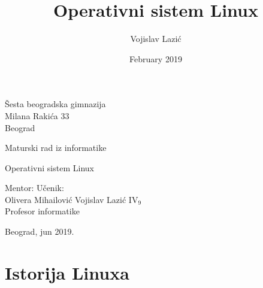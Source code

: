 \documentclass[12pt,twoside,a4paper]{article}
\title{Operativni sistem Linux}
\author{Vojislav Lazić}
\date{February 2019}
\begin{document}
    \thispagestyle{empty}
    \noindent
    Šesta beogradska gimnazija\\
    Milana Rakića 33\\
    Beograd
    \vfill
    \begin{center}
        \begin{Large}
        Maturski rad iz informatike\\
        \bigskip 
        \end{Large}
        {\Huge
        Operativni sistem Linux}
    \end{center}
    \vfill
    \noindent Mentor: \hfill Učenik:\\
    Olivera Mihailović \hfill Vojislav Lazić IV$_{9}$\\
    Profesor informatike
    \vfill
    \begin{center}
        Beograd, jun 2019.
    \end{center}
\thispagestyle{empty}


\newpage
\tableofcontents
\newpage
\section{Istorija Linuxa}


\renewcommand\refname{Literatura}


\end{document}

